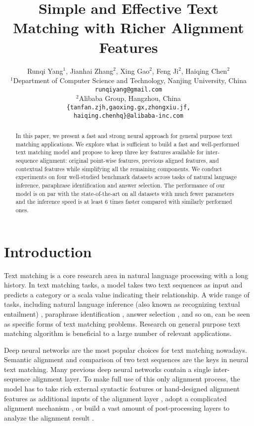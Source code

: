 \documentclass[11pt,a4paper]{article}
\title{Simple and Effective Text Matching with Richer Alignment Features}
\author{
  Runqi Yang$^1$, 
  Jianhai Zhang$^2$, Xing Gao$^2$, 
  Feng Ji$^2$, Haiqing Chen$^2$  \\
  $^1$Department of Computer Science and Technology, Nanjing University, China\\
  \texttt{runqiyang@gmail.com}\\
  $^2$Alibaba Group, Hangzhou, China\\
  \texttt{\{tanfan.zjh,gaoxing.gx,zhongxiu.jf,}\\
  \texttt{haiqing.chenhq\}@alibaba-inc.com}}
\date{}
\begin{document}
\maketitle
\begin{abstract}
  In this paper, we present a fast and strong neural approach for general purpose text matching applications. 
  We explore what is sufficient to build a fast and well-performed text matching model and propose to keep three key features available for inter-sequence alignment: original point-wise features, previous aligned features, and contextual features while simplifying all the remaining components.
  We conduct experiments on four well-studied benchmark datasets across tasks of natural language inference, paraphrase identification and answer selection. The performance of our model is on par with the state-of-the-art on all datasets with much fewer parameters and the inference speed is at least 6 times faster compared with similarly performed ones.
\end{abstract}

\section{Introduction}

Text matching is a core research area in natural language processing with a long history.
In text matching tasks, a model takes two text sequences as input and predicts a category or a scala value indicating their relationship.
A wide range of tasks, including natural language inference (also known as recognizing textual entailment) \cite{snli, scitail}, paraphrase identification \cite{wang2017bilateral}, answer selection \cite{wikiqa}, and so on, can be seen as specific forms of text matching problems. 
Research on general purpose text matching algorithm is beneficial to a large number of relevant applications.

Deep neural networks are the most popular choices for text matching nowadays. 
Semantic alignment and comparison of two text sequences are the keys in neural text matching. 
Many previous deep neural networks contain a single inter-sequence alignment layer. 
To make full use of this only alignment process, the model has to 
take rich external syntactic features or hand-designed alignment features as additional inputs of the alignment layer \cite{chen2017enhanced, gong2018natural},
adopt a complicated alignment mechanism \cite{wang2017bilateral, tan2018multiway}, 
or build a vast amount of post-processing layers to analyze the alignment result \cite{tay2018compare, gong2018natural}.
\end{document}
